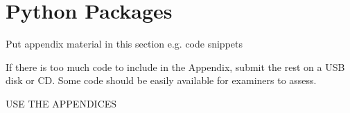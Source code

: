 \chapter{Python Packages}

Put appendix material in this section e.g. code snippets 

 If there is too much code to include in the Appendix, submit the rest on a USB disk or CD. Some code should be easily available for examiners to assess.
 
USE THE APPENDICES